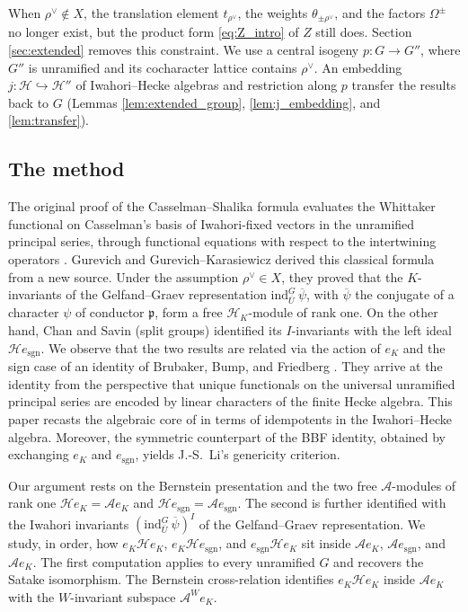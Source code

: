 \documentclass[12pt]{article}
\numberwithin{equation}{section}
\theoremstyle{definition}
\theoremstyle{remark}
\theoremstyle{plain}
\begin{document}
When $\rho^\vee \notin X$, the translation element $t_{\rho^\vee}$, the weights $\theta_{\pm\rho^\vee}$, and the factors $\Omega^{\pm}$ no longer exist, but the product form \eqref{eq:Z_intro} of $Z$ still does. Section \ref{sec:extended} removes this constraint. We use a central isogeny $p : G \to G''$, where $G''$ is unramified and its cocharacter lattice contains $\rho^\vee$. An embedding $j : \mathcal{H} \hookrightarrow \mathcal{H}''$ of Iwahori--Hecke algebras and restriction along $p$ transfer the results back to $G$ (Lemmas \ref{lem:extended_group}, \ref{lem:j_embedding}, and \ref{lem:transfer}).

\subsection*{The method}
The original proof of the Casselman--Shalika formula evaluates the Whittaker functional on Casselman's basis of Iwahori-fixed vectors in the unramified principal series, through functional equations with respect to the intertwining operators \cite{CS80}. Gurevich and Gurevich--Karasiewicz \cite{Gu13, GK22} derived this classical formula from a new source. Under the assumption $\rho^\vee \in X$, they proved that the $K$-invariants of the Gelfand--Graev representation $\mathrm{ind}_{\overline{U}}^{G}\,\overline{\psi}$, with $\overline{\psi}$ the conjugate of a character $\psi$ of conductor $\mathfrak{p}$, form a free $\mathcal{H}_{K}$-module of rank one. On the other hand, Chan and Savin \cite{CS18} (split groups) identified its $I$-invariants with the left ideal $\mathcal{H}e_{\mathrm{sgn}}$. We observe that the two results are related via the action of $e_{K}$ and the sign case of an identity of Brubaker, Bump, and Friedberg \cite[Theorem 5]{BBF16}. They arrive at the identity from the perspective that unique functionals on the universal unramified principal series are encoded by linear characters of the finite Hecke algebra. This paper recasts the algebraic core of \cite{BBF16} in terms of idempotents in the Iwahori--Hecke algebra. Moreover, the symmetric counterpart of the BBF identity, obtained by exchanging $e_K$ and $e_{\mathrm{sgn}}$, yields J.-S.\ Li's genericity criterion.

Our argument rests on the Bernstein presentation and the two free $\mathcal A$-modules of rank one $\mathcal{H}e_K = \mathcal{A}e_K$ and $\mathcal{H}e_{\mathrm{sgn}} = \mathcal{A}e_{\mathrm{sgn}}$. The second is further identified with the Iwahori invariants $(\mathrm{ind}_{\overline{U}}^{G}\,\overline{\psi})^I$ of the Gelfand--Graev representation. We study, in order, how $e_K\mathcal{H}e_K$, $e_K\mathcal{H}e_{\mathrm{sgn}}$, and $e_{\mathrm{sgn}}\mathcal{H}e_K$ sit inside $\mathcal{A}e_K$, $\mathcal{A}e_{\mathrm{sgn}}$, and $\mathcal{A}e_K$. The first computation applies to every unramified $G$ and recovers the Satake isomorphism. The Bernstein cross-relation identifies $e_K\mathcal H e_K$ inside $\mathcal A e_K$ with the $W$-invariant subspace $\mathcal A^W e_K$.
\end{document}
